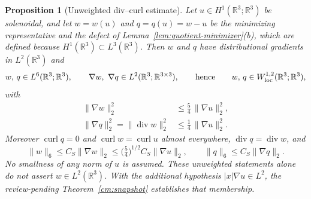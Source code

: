 \documentclass[11pt]{article}
\newtheorem{proposition}[theorem]{Proposition}
\theoremstyle{definition}
\theoremstyle{plain}
\newcommand{\R}{\mathbb R}
\newcommand{\norm}[1]{\lVert #1\rVert}
\begin{document}
\begin{proposition}[Unweighted div--curl estimate]
\label{prop:quotient-divcurl}
Let $u\in H^1(\R^3;\R^3)$ be solenoidal, and let $w=w(u)$ and $q=q(u)=w-u$
be the minimizing representative and the defect of
Lemma~\ref{lem:quotient-minimizer}(b), which are defined because
$H^1(\R^3)\subset L^3(\R^3)$.  Then $w$ and $q$ have distributional
gradients in $L^2(\R^3)$ and
\begin{equation}\label{eq:qdc-spaces}
 w,\,q\in L^6(\R^3;\R^3),\qquad
 \nabla w,\ \nabla q\in L^2(\R^3;\R^{3\times3}),
 \qquad\text{hence}\qquad
 w,\,q\in W^{1,2}_{\rm loc}(\R^3;\R^3),
\end{equation}
with
\begin{align}
 \norm{\nabla w}_2^2&\le\tfrac54\,\norm{\nabla u}_2^2,
 \label{eq:qdc-w}\\
 \norm{\nabla q}_2^2=\norm{\operatorname{div}w}_2^2
 &\le\tfrac14\,\norm{\nabla u}_2^2 .
 \label{eq:qdc-q}
\end{align}
Moreover $\operatorname{curl}q=0$ and $\operatorname{curl}w=\operatorname{curl}u$
almost everywhere, $\operatorname{div}q=\operatorname{div}w$, and
\begin{equation}\label{eq:qdc-sobolev}
 \norm w_6\le C_S\norm{\nabla w}_2\le\bigl(\tfrac54\bigr)^{1/2}C_S\norm{\nabla u}_2,
 \qquad
 \norm q_6\le C_S\norm{\nabla q}_2 .
\end{equation}
No smallness of any norm of $u$ is assumed. These unweighted statements
alone do not assert $w\in L^2(\R^3)$. With the additional hypothesis
$|x|\nabla u\in L^2$, the review-pending Theorem~\ref{cm:snapshot}
establishes that membership.
\end{proposition}
\end{document}
